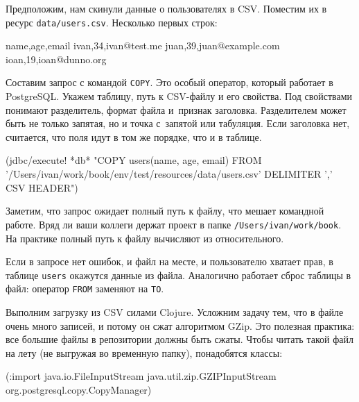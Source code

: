 Предположим, нам скинули данные о пользователях в CSV. Поместим их в ресурс
\verb|data/users.csv|. Несколько первых строк:

\begin{english}
  \begin{text}
name,age,email
ivan,34,ivan@test.me
juan,39,juan@example.com
ioan,19,ioan@dunno.org
  \end{text}
\end{english}


Составим запрос с командой \verb|COPY|. Это особый оператор, который работает в
PostgreSQL. Укажем таблицу, путь к CSV-файлу и его свойства. Под свойствами
понимают разделитель, формат файла и~признак заголовка. Разделителем может быть
не только запятая, но и точка с~запятой или табуляция. Если заголовка нет,
считается, что поля идут в том же порядке, что и в таблице.

\begin{english}
  \begin{clojure}
(jdbc/execute! *db*
 "COPY users(name, age, email)
  FROM '/Users/ivan/work/book/env/test/resources/data/users.csv'
  DELIMITER ',' CSV HEADER")
  \end{clojure}
\end{english}

Заметим, что запрос ожидает полный путь к файлу, что мешает командной
работе. Вряд ли ваши коллеги держат проект в папке
\verb|/Users/ivan/work/book|. На практике полный путь к файлу вычисляют из
относительного.

Если в запросе нет ошибок, и файл на месте, и пользователю хватает прав, в
таблице \verb|users| окажутся данные из файла. Аналогично работает сброс
таблицы в файл: оператор \verb|FROM| заменяют на \verb|TO|.


Выполним загрузку из CSV силами Clojure. Усложним задачу тем, что в файле очень
много записей, и потому он сжат алгоритмом GZip. Это полезная практика: все
большие файлы в репозитории должны быть сжаты. Чтобы читать такой файл на лету
(не выгружая во временную папку), понадобятся классы:

\begin{english}
  \begin{clojure}
(:import java.io.FileInputStream
         java.util.zip.GZIPInputStream
         org.postgresql.copy.CopyManager)
  \end{clojure}
\end{english}

